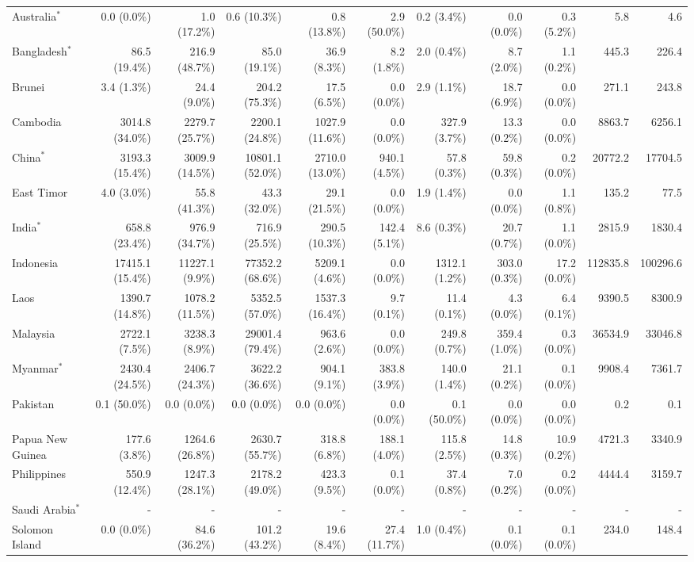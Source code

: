 \begin{scriptsize}
\begin{landscape}
\begin{center}
\begin{longtable}[ht]{lrrrrrrrrrr}
			Australia$^*$&0.0 (0.0\%)&1.0 (17.2\%)&0.6 (10.3\%)&0.8 (13.8\%)&2.9 (50.0\%)&0.2 (3.4\%)&0.0 (0.0\%)&0.3 (5.2\%)&5.8&4.6\\
			Bangladesh$^*$&86.5 (19.4\%)&216.9 (48.7\%)&85.0 (19.1\%)&36.9 (8.3\%)&8.2 (1.8\%)&2.0 (0.4\%)&8.7 (2.0\%)&1.1 (0.2\%)&445.3&226.4\\
			Brunei&3.4 (1.3\%)&24.4 (9.0\%)&204.2 (75.3\%)&17.5 (6.5\%)&0.0 (0.0\%)&2.9 (1.1\%)&18.7 (6.9\%)&0.0 (0.0\%)&271.1&243.8\\
			Cambodia&3014.8 (34.0\%)&2279.7 (25.7\%)&2200.1 (24.8\%)&1027.9 (11.6\%)&0.0 (0.0\%)&327.9 (3.7\%)&13.3 (0.2\%)&0.0 (0.0\%)&8863.7&6256.1\\
			China$^*$&3193.3 (15.4\%)&3009.9 (14.5\%)&10801.1 (52.0\%)&2710.0 (13.0\%)&940.1 (4.5\%)&57.8 (0.3\%)&59.8 (0.3\%)&0.2 (0.0\%)&20772.2&17704.5\\
			East Timor&4.0 (3.0\%)&55.8 (41.3\%)&43.3 (32.0\%)&29.1 (21.5\%)&0.0 (0.0\%)&1.9 (1.4\%)&0.0 (0.0\%)&1.1 (0.8\%)&135.2&77.5\\
			India$^*$&658.8 (23.4\%)&976.9 (34.7\%)&716.9 (25.5\%)&290.5 (10.3\%)&142.4 (5.1\%)&8.6 (0.3\%)&20.7 (0.7\%)&1.1 (0.0\%)&2815.9&1830.4\\
			Indonesia&17415.1 (15.4\%)&11227.1 (9.9\%)&77352.2 (68.6\%)&5209.1 (4.6\%)&0.0 (0.0\%)&1312.1 (1.2\%)&303.0 (0.3\%)&17.2 (0.0\%)&112835.8&100296.6\\
			Laos&1390.7 (14.8\%)&1078.2 (11.5\%)&5352.5 (57.0\%)&1537.3 (16.4\%)&9.7 (0.1\%)&11.4 (0.1\%)&4.3 (0.0\%)&6.4 (0.1\%)&9390.5&8300.9\\
			Malaysia&2722.1 (7.5\%)&3238.3 (8.9\%)&29001.4 (79.4\%)&963.6 (2.6\%)&0.0 (0.0\%)&249.8 (0.7\%)&359.4 (1.0\%)&0.3 (0.0\%)&36534.9&33046.8\\
			Myanmar$^*$&2430.4 (24.5\%)&2406.7 (24.3\%)&3622.2 (36.6\%)&904.1 (9.1\%)&383.8 (3.9\%)&140.0 (1.4\%)&21.1 (0.2\%)&0.1 (0.0\%)&9908.4&7361.7\\
			Pakistan&0.1 (50.0\%)&0.0 (0.0\%)&0.0 (0.0\%)&0.0 (0.0\%)&0.0 (0.0\%)&0.1 (50.0\%)&0.0 (0.0\%)&0.0 (0.0\%)&0.2&0.1\\
			Papua New Guinea&177.6 (3.8\%)&1264.6 (26.8\%)&2630.7 (55.7\%)&318.8 (6.8\%)&188.1 (4.0\%)&115.8 (2.5\%)&14.8 (0.3\%)&10.9 (0.2\%)&4721.3&3340.9\\
			Philippines&550.9 (12.4\%)&1247.3 (28.1\%)&2178.2 (49.0\%)&423.3 (9.5\%)&0.1 (0.0\%)&37.4 (0.8\%)&7.0 (0.2\%)&0.2 (0.0\%)&4444.4&3159.7\\
			Saudi Arabia$^*$&-&-&-&-&-&-&-&-&-&-\\
			Solomon Island&0.0 (0.0\%)&84.6 (36.2\%)&101.2 (43.2\%)&19.6 (8.4\%)&27.4 (11.7\%)&1.0 (0.4\%)&0.1 (0.0\%)&0.1 (0.0\%)&234.0&148.4\\

\end{longtable}
\end{center}
\end{landscape}
\end{scriptsize}

